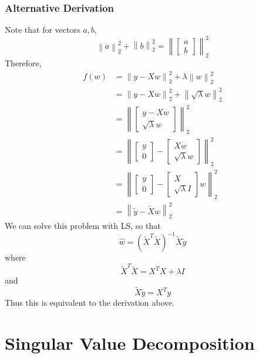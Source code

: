 \documentclass[12pt]{article}
\theoremstyle{definition}
\newcommand{\norm}[1]{\left\lVert#1\right\rVert}
\begin{document}
\subsubsection{Alternative Derivation}
Note that for vectors $a, b$, 
\begin{equation}
	\norm{a}^2_2 + \norm{b}^2_2 = \norm{\begin{bmatrix} a \\ b \end{bmatrix}}^2_2
\end{equation}
Therefore, 
\begin{align*}
	f(w) &= \norm{y - Xw}^2_2 + \lambda \norm{w}^2_2 \\
	&= \norm{y - Xw}^2_2 + \norm{\sqrt{\lambda} w}^2_2 \\
	&= \norm{\begin{bmatrix} y - Xw \\ \sqrt{\lambda}w \end{bmatrix}}^2_2 \\
	&= \norm{\begin{bmatrix} y \\ 0 \end{bmatrix} - \begin{bmatrix} Xw \\ \sqrt{\lambda}w \end{bmatrix}}^2_2 \\
	&= \norm{\begin{bmatrix} y \\ 0 \end{bmatrix} - \begin{bmatrix} X \\ \sqrt{\lambda}I \end{bmatrix} w}^2_2 \\
	&= \norm{\tilde{y} - \tilde{X}w}^2_2
\end{align*}
We can solve this problem with LS, so that
\begin{equation}
	\hat w = (\tilde{X}^T \tilde{X})^{-1} \tilde{X} \tilde{y}
\end{equation}
where
\begin{equation}
	\tilde{X}^T \tilde{X} = X^TX + \lambda I
\end{equation}
and
\begin{equation}
	\tilde{X} \tilde{y} = X^Ty
\end{equation}
Thus this is equivalent to the derivation above. 

\section{Singular Value Decomposition}
\end{document}
